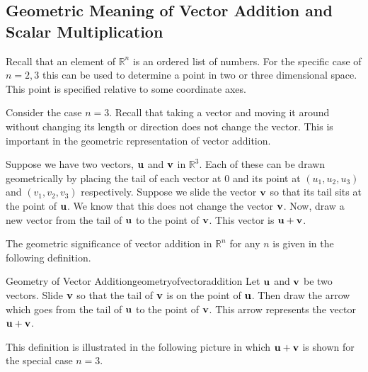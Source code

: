 \subsection{Geometric Meaning of Vector Addition and Scalar Multiplication}

Recall that an element of $\mathbb{R}^{n}$ is an ordered list of
numbers. For the specific case of $n=2,3$ this can be used to
determine a point in two or three dimensional space. This point is
specified relative to some coordinate axes.

Consider the case $n=3$. Recall that taking a vector and moving it
around without changing its length or direction does not change the
vector. This is important in the geometric representation of vector
addition.

Suppose we have two vectors, ${\bf u}$ and ${\bf v}$ in
$\mathbb{R}^{3}$. Each of these can be drawn geometrically by placing
the tail of each vector at $0$ and its point at $\left( u_{1}, u_{2},
u_{3}\right)$ and $\left( v_{1}, v_{2}, v_{3}\right) $
respectively. Suppose we slide the vector ${\bf v}$ so that its tail
sits at the point of ${\bf u}$.  We know that this does not change
the vector ${\bf v}$.  Now, draw a new vector from the tail of
${\bf u}$ to the point of ${\bf v}$. This vector is
${\bf u}+{\bf v}$.

The geometric significance of vector addition in $\mathbb{R}^n$ for any $n$ is given in
the following definition.

\begin{definition}{Geometry of Vector Addition}{geometryofvectoraddition}
Let ${\bf u}$ and ${\bf v}$ be two vectors. Slide ${\bf v}$ so that
the tail of ${\bf v}$ is on the point of ${\bf u}$. Then draw the
arrow which goes from the tail of ${\bf u}$ to the point of ${\bf v}$. 
This arrow represents the vector ${\bf u}+{\bf v}$.

\begin{center}
\end{center}
\end{definition}

This definition is illustrated in the following picture in which
${\bf u}+{\bf v}$ is shown for the special case $n=3$.

